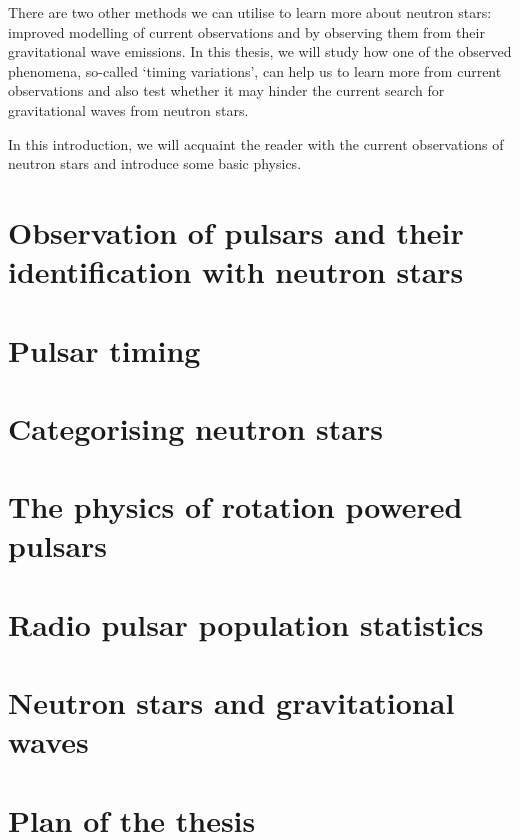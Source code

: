 \documentclass[../full_thesis/full_thesis.tex]{subfiles}
\newcommand{\thisdir}{../introduction}
\begin{document}
There are two other methods we can utilise to learn more about neutron stars: improved
modelling of current observations and by observing them from their
gravitational wave emissions. In this thesis, we will study how one of the
observed phenomena, so-called `timing variations', can help us to learn more
from current observations and also test whether it may hinder the current
search for gravitational waves from neutron stars.

In this introduction, we will acquaint the reader with the current observations
of neutron stars and introduce some basic physics.

\section{Observation of pulsars and their identification with neutron stars}


\section{Pulsar timing}
\label{sec: pulsar timing methods}


\section{Categorising neutron stars}
\label{sec: categorising neutron stars}


\section{The physics of rotation powered pulsars} 
\label{sec: rotation powered pulsars}


\section{Radio pulsar population statistics}
\label{sec: population stats}


\section{Neutron stars and gravitational waves}
\label{sec: gravitational waves}



\section{Plan of the thesis}
\end{document}
